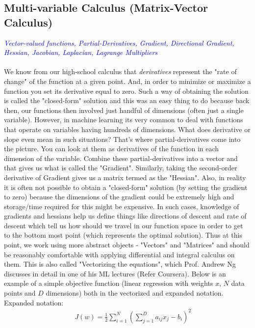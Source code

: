 \documentclass[a4paper]{article}
\begin{document}
\subsection{Multi-variable Calculus (Matrix-Vector Calculus)}
\textcolor{blue}{\textit{Vector-valued functions, Partial-Derivatives, Gradient, Directional Gradient, Hessian, Jacobian, Laplacian, Lagrange Multipliers}} \\ \\
We know from our high-school calculus that {\it derivatives} represent the "rate of change" of the function at a given point. And, in order to minimize or maximize a function you set its derivative equal to zero. Such a way of obtaining the solution is called the "closed-form" solution and this was an easy thing to do because back then, our functions then involved just handful of dimensions (often just a single variable). However, in machine learning its very common to deal with functions that operate on variables having hundreds of dimensions. What does derivative or slope even mean in such situations? That's where partial-derivatives come into the picture. You can look at them as derivatives of the function in each dimension of the variable. Combine these partial-derivatives into a vector and that gives us what is called the "Gradient". Similarly, taking the second-order derivative of Gradient gives us a matrix termed as the "Hessian". Also, in reality it is often not possible to obtain a "closed-form" solution (by setting the gradient to zero) because the dimensions of the gradient could be extremely high and storage/time required for this might be expensive. In such cases, knowledge of gradients and hessians help us define things like directions of descent and rate of descent which tell us how should we travel in our function space in order to get to the bottom most point (which represents the optimal solution). Thus at this point, we work using more abstract objects - "Vectors" and "Matrices" and should be reasonably comfortable with applying differential and integral calculus on them. This is also called "Vectorizing the equations", which Prof. Andrew Ng discusses in detail in one of his ML lectures (Refer Coursera). Below is an example of a simple objective function (linear regression with weights $x$, $N$ data points and $D$ dimensions) both in the vectorized and expanded notation. \\

Expanded notation:
\begin{equation} \label{eq:4}
\begin{aligned}
& & J(w) = \frac{1}{2} \sum_{i=1}^{N} (\sum_{j=1}^{D} a_{ij} x_j - b_i)^2
\end{aligned}
\end{equation}
\end{document}
